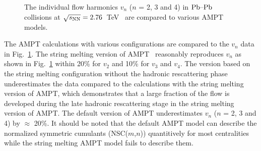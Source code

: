 \begin{figure}[h]
\begin{center}
        \caption{The individual flow harmonics $v_n$ ($n$ = 2, 3 and 4) in $\textnormal{Pb--Pb}$ collisions at $\sqrt{s_{\textnormal{NN}}}=2.76$~TeV~\cite{Adam:2016izf} are compared to various AMPT models.}
        \label{fig:Figure_A3}
              \end{center}
\end{figure}

The AMPT calculations with various configurations are compared to the $v_n$ data in Fig.~\ref{fig:Figure_A3}.
The string melting version of AMPT~\cite{Lin:2001zk,Lin:2004en} reasonably reproduces $v_n$ as shown in Fig.~\ref{fig:Figure_A3} within 20\% for $v_2$ and 10\% for $v_3$ and $v_4$. The version based on the string melting configuration without the hadronic rescattering phase underestimates the data compared to the calculations with the string melting version of AMPT, which demonstrates that a large fraction of the flow is developed during the late hadronic rescattering stage in the string melting version of AMPT.
The default version of AMPT underestimates $v_n$ ($n$ = 2, 3 and 4) by $\approx$ 20\%. It should be noted that the default AMPT model can describe the normalized symmetric cumulants (NSC($m$,$n$)) quantitively for most centralities while the string melting AMPT model fails to describe them.

